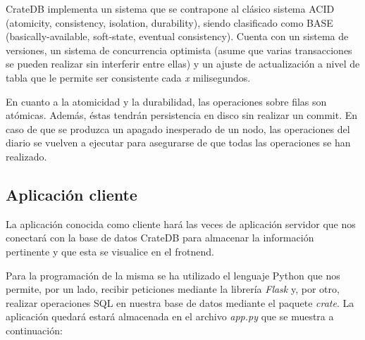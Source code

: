 \documentclass[12pt]{article}
\begin{document}
CrateDB implementa un sistema que se contrapone al clásico sistema
ACID (atomicity, consistency, isolation, durability), siendo clasificado como 
BASE (basically-available, soft-state, eventual consistency). Cuenta con un sistema
de versiones, un sistema de concurrencia optimista (asume que varias transacciones
se pueden realizar sin interferir entre ellas) y un ajuste de actualización a nivel
de tabla que le permite ser consistente cada \emph{x} milisegundos.

En cuanto a la atomicidad y la durabilidad, las operaciones sobre filas son atómicas.
Además, éstas tendrán persistencia en disco sin realizar un commit. En caso de que se
produzca un apagado inesperado de un nodo, las operaciones del diario se vuelven a
ejecutar para asegurarse de que todas las operaciones se han realizado.

\subsection[2]{Aplicación cliente}
La aplicación conocida como cliente hará las veces de aplicación servidor que nos
conectará con la base de datos CrateDB para almacenar la información pertinente y que
esta se visualice en el frotnend.

Para la programación de la misma se ha utilizado el lenguaje Python que nos permite, por
un lado, recibir peticiones mediante la librería \emph{Flask} y, por otro, realizar operaciones
SQL en nuestra base de datos mediante el paquete \emph{crate}. La aplicación quedará estará
almacenada en el archivo \emph{app.py} que se muestra a continuación:
\end{document}
